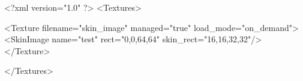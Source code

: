 <?xml version="1.0" ?>
<Textures>

	<Texture filename="skin_image" managed="true" load_mode="on_demand">
		<SkinImage name="test" rect="0,0,64,64" skin_rect="16,16,32,32"/>
	</Texture>
	
</Textures>
